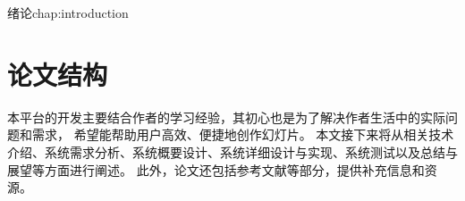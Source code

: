 \begin{cuzchapter}{绪论}{chap:introduction}





	\section{论文结构}\label{sec:structure}

	本平台的开发主要结合作者的学习经验，其初心也是为了解决作者生活中的实际问题和需求，
	希望能帮助用户高效、便捷地创作幻灯片。
	本文接下来将从相关技术介绍、系统需求分析、系统概要设计、系统详细设计与实现、系统测试以及总结与展望等方面进行阐述。
	此外，论文还包括参考文献等部分，提供补充信息和资源。

\end{cuzchapter}